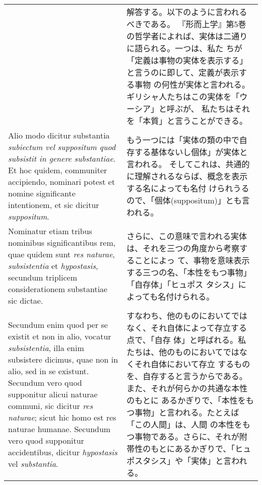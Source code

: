 \documentclass[10pt]{jsarticle} %
\begin{document}
\begin{longtable}{p{21em}p{21em}}
&


解答する。以下のように言われるべきである。
『形而上学』第5巻の哲学者によれば、実体は二通りに語られる。一つは、私た
 ちが「定義は事物の実体を表示する」と言うのに即して、定義が表示する事物
 の何性が実体と言われる。ギリシャ人たちはこの実体を「ウーシア」と呼ぶが、
 私たちはそれを「本質」と言うことができる。

\\


Alio modo dicitur substantia
{\itshape subiectum vel suppositum quod subsistit in genere substantiae}. Et hoc
quidem, communiter accipiendo, nominari potest et nomine significante
intentionem, et sic dicitur {\itshape suppositum}. 

&

もう一つには「実体の類の中で自存する基体ないし個体」が実体と言われる。
 そしてこれは、共通的に理解されるならば、概念を表示する名によっても名付
 けられうるので、「個体(suppositum)」とも言われる。


\\


Nominatur etiam tribus nominibus
significantibus rem, quae quidem sunt {\itshape res naturae}, {\itshape subsistentia} et
{\itshape hypostasis}, secundum triplicem considerationem substantiae sic
dictae.  

&

さらに、この意味で言われる実体は、それを三つの角度から考察することによっ
 て、事物を意味表示する三つの名、「本性をもつ事物」「自存体」「ヒュポス
 タシス」によっても名付けられる。


\\


Secundum enim quod per se existit et non in alio, vocatur
{\itshape subsistentia}, illa enim subsistere dicimus, quae non in alio, sed in se
existunt.
Secundum vero quod supponitur alicui naturae communi, sic
dicitur {\itshape res naturae}; sicut hic homo est res naturae humanae. Secundum
vero quod supponitur accidentibus, dicitur {\itshape hypostasis} vel
{\itshape substantia}. 

&

すなわち、他のものにおいてではなく、それ自体によって存立する点で、「自存
 体」と呼ばれる。私たちは、他のものにおいてではなくそれ自体において存立
 するものを、自存すると言うからである。また、それが何らかの共通な本性のもとに
 あるかぎりで、「本性をもつ事物」と言われる。たとえば「この人間」は、人間
 の本性をもつ事物である。さらに、それが附帯性のもとにあるかぎりで、「ヒュ
 ポスタシス」や「実体」と言われる。


\end{longtable}
\end{document}
